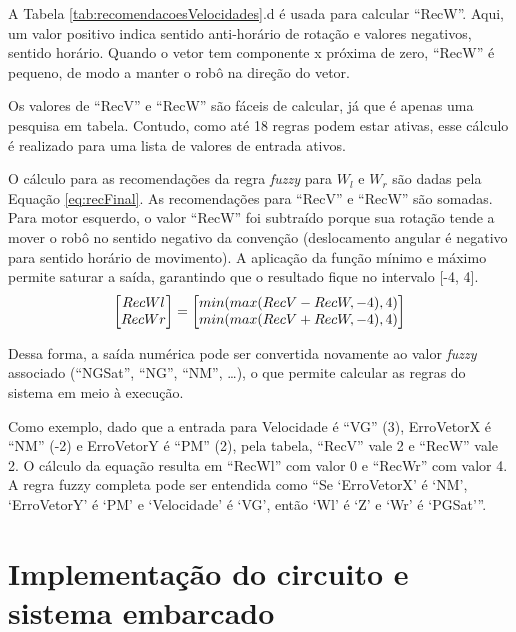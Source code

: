 	A Tabela \ref{tab:recomendacoesVelocidades}.d é usada para calcular ``RecW''. Aqui, um valor
	positivo indica sentido anti-horário de rotação e valores negativos, sentido horário. Quando
	o vetor tem componente x próxima de zero, ``RecW'' é pequeno, de modo a manter o robô na
	direção do vetor.
	
	Os valores de ``RecV'' e ``RecW'' são fáceis de calcular, já que é apenas uma pesquisa em 
	tabela. Contudo, como até 18 regras podem estar ativas, esse cálculo é realizado para uma 
	lista de valores de entrada ativos. 
	
	O cálculo para as recomendações da regra \textit{fuzzy} para $W_l$ e $W_r$ são dadas 
	pela Equação \ref{eq:recFinal}. As recomendações para ``RecV'' e ``RecW'' são somadas. Para
	motor esquerdo, o valor ``RecW'' foi subtraído porque sua rotação tende a mover o robô no 
	sentido negativo da convenção (deslocamento angular é negativo para sentido horário de 
	movimento). A aplicação da função mínimo e máximo permite saturar a saída, garantindo que 
	o resultado fique no intervalo [-4, 4]. 
	\begin{equation}
		\label{eq:recFinal}
			\mleft[
			\begin{matrix}
		  		RecWl\\
		  		RecWr\\
			\end{matrix}
			\mright] = \mleft[
			\begin{matrix}
		  		min(max(RecV - RecW,-4),4) \\
		  		min(max(RecV + RecW,-4),4) \\
			\end{matrix}
			\mright]
	\end{equation}
	
	Dessa forma, a saída numérica pode ser convertida novamente ao valor \textit{fuzzy} 
	associado (``NGSat'', ``NG'', ``NM'', \dots), o que permite calcular as regras do sistema
	em meio à execução.
	
	Como exemplo, dado que a entrada para Velocidade é ``VG'' (3), ErroVetorX é ``NM'' (-2) 
	e ErroVetorY é ``PM'' (2), pela tabela, ``RecV'' vale 2 e ``RecW'' vale 2. O cálculo da
	equação resulta em ``RecWl'' com valor 0 e ``RecWr'' com valor 4. A regra fuzzy completa
	pode ser entendida como ``Se `ErroVetorX' é `NM', `ErroVetorY' é `PM' e `Velocidade' é 
	`VG', então `Wl' é `Z' e `Wr' é `PGSat'''. 
	
\section{Implementação do circuito e sistema embarcado}

